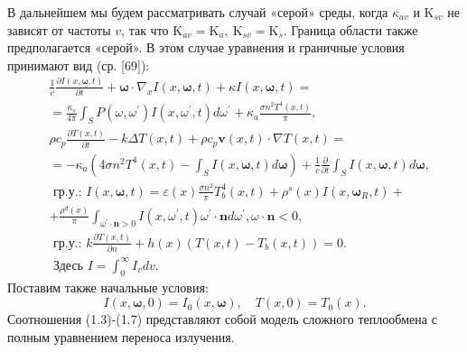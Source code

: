 В дальнейшем мы будем рассматривать случай «серой» среды,
когда $\kappa_{a v}$ и $\mathrm{K}_{s v}$ не зависят от частоты $v$,
так что $\mathrm{K}_{a v}=\mathrm{K}_{a}, \mathrm{~K}_{s v}=\mathrm{K}_{s}$.
Граница области также предполагается «серой».
В этом случае уравнения и граничные условия принимают вид (ср. [69]):
\[
    \begin{aligned}
        & \frac{1}{c} \frac{\partial I(x, \boldsymbol{\omega}, t)}{\partial t}+\boldsymbol{\omega} \cdot \nabla_{x} I(x, \boldsymbol{\omega}, t)+\kappa I(x, \boldsymbol{\omega}, t)= \\
        & =\frac{\kappa_{s}}{4 \pi} \int_{S} P\left(\omega, \omega^{\prime}\right) I\left(x, \omega^{\prime}, t\right) d \omega^{\prime}+\kappa_{a} \frac{\sigma n^{2} T^{4}(x, t)}{\pi}, \\
        & \rho c_{p} \frac{\partial T(x, t)}{\partial t}-k \Delta T(x, t)+\rho c_{p} \mathbf{v}(x, t) \cdot \nabla T(x, t)= \\
        & =-\mathrm{\kappa}_{a}\left(4 \sigma n^{2} T^{4}(x, t)-\int_{S} I(x, \boldsymbol{\omega}, t) d \boldsymbol{\omega}\right)+\frac{1}{c} \frac{\partial}{\partial t} \int_{S} I(x, \boldsymbol{\omega}, t) d \boldsymbol{\omega}, \\
        & \text { гр.у.: } I(x, \boldsymbol{\omega}, t)=\varepsilon(x) \frac{\sigma n^{2}}{\pi} T_{b}^{4}(x, t)+\rho^{s}(x) I\left(x, \boldsymbol{\omega}_{R}, t\right)+ \\
        & +\frac{\rho^{d}(x)}{\pi} \int_{\omega^{\prime} \cdot \mathbf{n}>0} I\left(x, \omega^{\prime}, t\right) \omega^{\prime} \cdot \mathbf{n} d \omega^{\prime}, \omega \cdot \mathbf{n}<0, \\
        & \text { гр.у.: } k \frac{\partial T(x, t)}{\partial n}+h(x)\left(T(x, t)-T_{b}(x, t)\right)=0 \text {. } \\
        & \text { Здесь } I=\int_{0}^{\infty} I_{v} d v \text {. }
    \end{aligned}
\]
Поставим также начальные условия:
\[
    I(x, \boldsymbol{\omega}, 0)=I_{0}(x, \boldsymbol{\omega}), \quad T(x, 0)=T_{0}(x) .
\]
Соотношения (1.3)-(1.7) представляют собой модель сложного теплообмена с полным уравнением переноса излучения.


